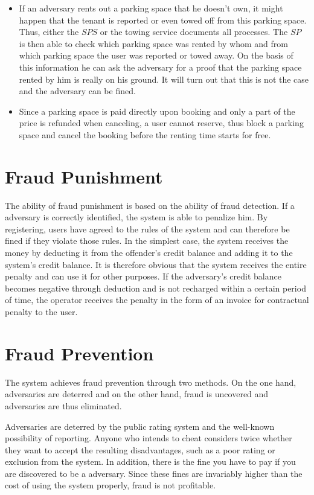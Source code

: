\begin{itemize}
\item If an adversary rents out a parking space that he doesn't own, it might happen that the tenant is reported or even towed off from this parking space. Thus, either the $SPS$ or the towing service documents all processes. The $SP$ is then able to check which parking space was rented by whom and from which parking space the user was reported or towed away. On the basis of this information he can ask the adversary for a proof that the parking space rented by him is really on his ground. It will turn out that this is not the case and the adversary can be fined.
\item Since a parking space is paid directly upon booking and only a part of the price is refunded when canceling, a user cannot reserve, thus block a parking space and cancel the booking before the renting time starts for free.
\end{itemize}


\section{Fraud Punishment}
The ability of fraud punishment is based on the ability of fraud detection. If a adversary is correctly identified, the system is able to penalize him. By registering, users have agreed to the rules of the system and can therefore be fined if they violate those rules. In the simplest case, the system receives the money by deducting it from the offender's credit balance and adding it to the system's credit balance. It is therefore obvious that the system receives the entire penalty and can use it for other purposes. If the adversary's credit balance becomes negative through deduction and is not recharged within a certain period of time, the operator receives the penalty in the form of an invoice for contractual penalty to the user.

\section{Fraud Prevention}
The system achieves fraud prevention through two methods. On the one hand, adversaries are deterred and on the other hand, fraud is uncovered and adversaries are thus eliminated.

Adversaries are deterred by the public rating system and the well-known possibility of reporting. Anyone who intends to cheat considers twice whether they want to accept the resulting disadvantages, such as a poor rating or exclusion from the system. In addition, there is the fine you have to pay if you are discovered to be a adversary. Since these fines are invariably higher than the cost of using the system properly, fraud is not profitable.

